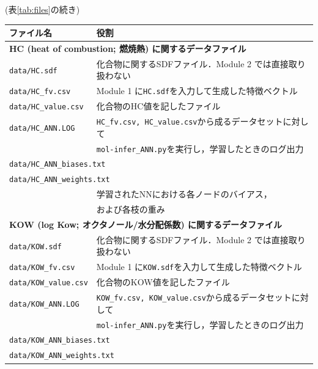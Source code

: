 \documentclass[11pt, titlepage, dvipdfmx, twoside]{jarticle}
\newcommand{\tabref}[1]{表\ref{tab:#1}}
\begin{document}
\begin{table}[t!]
  \centering
  (\tabref{files}の続き)
  \begin{tabular}{lcll}
  \hline
  \bf ファイル名 &\ \ & \multicolumn{2}{l}{\bf 役割}\\
  \hline
  \multicolumn{4}{l}{\bf HC (heat of combustion; 燃焼熱) に関するデータファイル~\cite{pubchem}}\\
  \multicolumn{2}{l}{\tt data/HC.sdf} & \multicolumn{2}{l}{化合物に関するSDFファイル．Module 2 では直接取り扱わない}\\
  \multicolumn{2}{l}{\tt data/HC\_fv.csv} & \multicolumn{2}{l}{Module 1 に{\tt HC.sdf}を入力して生成した特徴ベクトル}\\
  \multicolumn{2}{l}{\tt data/HC\_value.csv} & \multicolumn{2}{l}{化合物のHC値を記したファイル}\\
  \multicolumn{2}{l}{\tt data/HC\_ANN.LOG} & \multicolumn{2}{l}{{\tt HC\_fv.csv, HC\_value.csv}から成るデータセットに対して}\\
  &&\multicolumn{2}{l}{{\tt mol-infer\_ANN.py}を実行し，学習したときのログ出力}\\
  \multicolumn{4}{l}{\tt data/HC\_ANN\_biases.txt} \\
  \multicolumn{4}{l}{\tt data/HC\_ANN\_weights.txt} \\
  &&\multicolumn{2}{l}{学習されたNNにおける各ノードのバイアス，}\\
  &&\multicolumn{2}{l}{および各枝の重み}\\
  \hline
  \multicolumn{4}{l}{\bf KOW (log Kow; オクタノール/水分配係数) に関するデータファイル~\cite{pubchem}}\\
  \multicolumn{2}{l}{\tt data/KOW.sdf} & \multicolumn{2}{l}{化合物に関するSDFファイル．Module 2 では直接取り扱わない}\\
  \multicolumn{2}{l}{\tt data/KOW\_fv.csv} & \multicolumn{2}{l}{Module 1 に{\tt KOW.sdf}を入力して生成した特徴ベクトル}\\
  \multicolumn{2}{l}{\tt data/KOW\_value.csv} & \multicolumn{2}{l}{化合物のKOW値を記したファイル}\\
  \multicolumn{2}{l}{\tt data/KOW\_ANN.LOG} & \multicolumn{2}{l}{{\tt KOW\_fv.csv, KOW\_value.csv}から成るデータセットに対して}\\
  &&\multicolumn{2}{l}{{\tt mol-infer\_ANN.py}を実行し，学習したときのログ出力}\\
  \multicolumn{4}{l}{\tt data/KOW\_ANN\_biases.txt} \\
  \multicolumn{4}{l}{\tt data/KOW\_ANN\_weights.txt} \\

\end{tabular}
\end{table}
\end{document}
